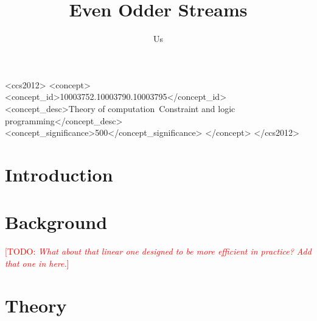 \documentclass[screen,anonymous,review,draft,natbib=false]{acmart} %
\newcommand{\meta}[2]{[\textsc{#1}: \emph{#2}]}
\newcommand{\todo}[1]{\textcolor{red}{\meta{TODO}{#1}}}
\begin{document}
\title{Even Odder Streams}

\author{Us}



\begin{abstract}
\end{abstract}

\begin{CCSXML}
<ccs2012>
   <concept>
       <concept_id>10003752.10003790.10003795</concept_id>
       <concept_desc>Theory of computation~Constraint and logic programming</concept_desc>
       <concept_significance>500</concept_significance>
       </concept>
 </ccs2012>
\end{CCSXML}




\maketitle

\section{Introduction}\label{sec:intro}

\section{Background}\label{sec:background}


\todo{What about that linear one designed to be more efficient in
  practice? Add that one in here.}

\section{Theory}\label{sec:theory}
\end{document}
